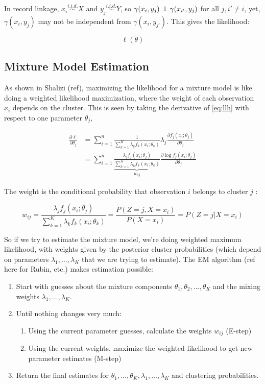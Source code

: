 \documentclass[11pt,reqno]{amsart}
\newcommand\independent{\protect\mathpalette{\protect\independenT}{\perp}}
\def\independenT#1#2{\mathrel{\rlap{$#1#2$}\mkern2mu{#1#2}}}
\begin{document}
In record linkage, $x_i \overset{i.i.d.}{\sim}X$ and $y_j  \overset{i.i.d.}{\sim} Y$, so $\gamma(x_i, y_j) \independent \gamma(x_{i'}, y_j)$ for all  $j, i'\neq i$, yet, $\gamma(x_i,y_j) $ may not be independent from $\gamma(x_i,y_{j'})$.  This gives the likelihood:


\begin{equation} \ell(\theta) \end{equation}
\subsection{Mixture Model Estimation}
As shown in Shalizi (ref), maximizing the likelihood for a mixture model is like doing a weighted likelihood maximization, where the weight of each observation $x_i$ depends on the cluster.  This is seen by taking the derivative of \eqref{eq:llh} with respect to one parameter $\theta_j$,

\begin{align*}
\frac{\partial \ell}{\partial \theta_j} &= \sum_{i=1}^n \frac{1}{\sum_{k=1}^K\lambda_k f_k(x_i; \theta_k)} \lambda_j \frac{\partial f_j(x_i;\theta_j)}{\partial \theta_j} \\
&= \sum_{i=1}^n \underbrace{\frac{\lambda_j f_j(x_i;\theta_j)}{\sum_{k=1}^K\lambda_k f_k(x_i; \theta_k)}}_{w_{ij}}  \frac{\partial \log f_j(x_i;\theta_j)}{\partial \theta_j} 
\end{align*}

The weight is the conditional probability that observation $i$ belongs to cluster $j$ :

\[w_{ij} = \frac{\lambda_j f_j(x_i;\theta_j)}{\sum_{k=1}^K\lambda_k f_k(x_i; \theta_k)} = \frac{P(Z=j, X=x_i)}{P(X=x_i)}= P(Z=j | X=x_i)\] 

So if we try to estimate the mixture model, we're doing weighted maximum likelihood, with weights given by the posterior cluster probabilities (which depend on parameters $\lambda_1,\dots,\lambda_K$ that we are trying to estimate).  The EM algorithm (ref here for Rubin, etc.) makes estimation possible: 
\begin{enumerate}
\item Start with guesses about the mixture components $\theta_1, \theta_2, \dots, \theta_K$ and the mixing weights $\lambda_1,\dots,\lambda_K$. 
\item Until nothing changes very much:
\begin{enumerate}
\item Using the current parameter guesses, calculate the weights $w_{ij}$ (E-step) 
\item Using the current weights, maximize the weighted likelihood to get new parameter estimates (M-step)
\end{enumerate}
\item Return the final estimates for $\theta_1, \dots, \theta_K, \lambda_1,\dots,\lambda_K$ and clustering probabilities. 
\end{enumerate}
\end{document}
